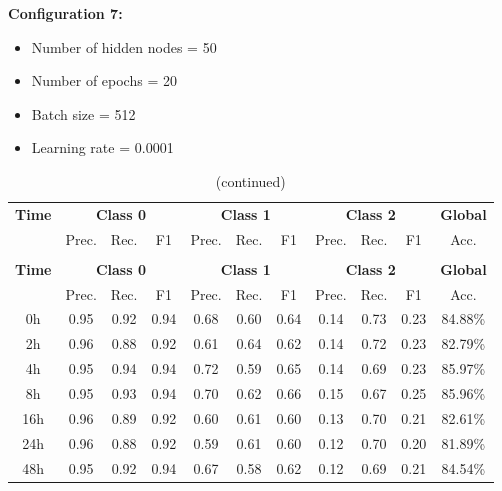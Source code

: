 \documentclass[12pt,oneside]{book} %
\begin{document}
\clearpage
\noindent \textbf{Configuration 7:}
\begin{multicols}{2}
    \begin{itemize}
        \item Number of hidden nodes = 50
        \item Number of epochs = 20
    \end{itemize}
    \begin{itemize}
         \item Batch size = 512
         \item Learning rate = 0.0001
    \end{itemize}
\end{multicols}

\setlength\LTleft{1cm}
\begin{longtable}{ c ccc ccc ccc c}
\caption{Performance metrics of the LNN model for configuration 7} \\
\toprule
\textbf{Time} & \multicolumn{3}{c}{\textbf{Class 0}} & \multicolumn{3}{c}{\textbf{Class 1}} & \multicolumn{3}{c}{\textbf{Class 2}} & \textbf{Global} \\
               & Prec. & Rec. & F1  & Prec. & Rec. & F1   & Prec. & Rec. & F1  & Acc. \\
\midrule
\endfirsthead

\caption[]{(continued)} \\
\toprule
\textbf{Time} & \multicolumn{3}{c}{\textbf{Class 0}} & \multicolumn{3}{c}{\textbf{Class 1}} & \multicolumn{3}{c}{\textbf{Class 2}} & \textbf{Global} \\
               & Prec. & Rec. & F1  & Prec. & Rec. & F1   & Prec. & Rec. & F1  & Acc. \\
\midrule
\endhead

\bottomrule
\endfoot

\bottomrule
\endlastfoot

0h   & 0.95  & 0.92 & 0.94 & 0.68  & 0.60 & 0.64  & 0.14  & 0.73 & 0.23 & 84.88\% \\
2h   & 0.96  & 0.88 & 0.92 & 0.61  & 0.64 & 0.62  & 0.14  & 0.72 & 0.23 & 82.79\% \\
4h   & 0.95  & 0.94 & 0.94 & 0.72  & 0.59 & 0.65  & 0.14  & 0.69 & 0.23 & 85.97\% \\
8h   & 0.95  & 0.93 & 0.94 & 0.70  & 0.62 & 0.66  & 0.15  & 0.67 & 0.25 & 85.96\% \\
16h  & 0.96  & 0.89 & 0.92 & 0.60  & 0.61 & 0.60  & 0.13  & 0.70 & 0.21 & 82.61\% \\
24h  & 0.96  & 0.88 & 0.92 & 0.59  & 0.61 & 0.60  & 0.12  & 0.70 & 0.20 & 81.89\% \\
48h  & 0.95  & 0.92 & 0.94 & 0.67  & 0.58 & 0.62  & 0.12  & 0.69 & 0.21 & 84.54\% \\
\end{longtable}
\end{document}
